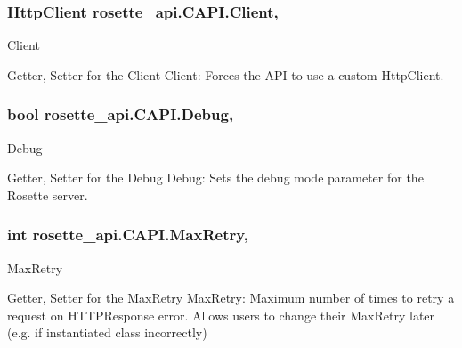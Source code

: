\subsubsection[{Client}]{\setlength{\rightskip}{0pt plus 5cm}Http\+Client rosette\+\_\+api.\+C\+A\+P\+I.\+Client\hspace{0.3cm}{\ttfamily [get]}, {\ttfamily [set]}}\label{classrosette__api_1_1_c_a_p_i_adb40d6828661d95567d124a2a57852d5}


Client 

Getter, Setter for the Client Client\+: Forces the A\+P\+I to use a custom Http\+Client. \hypertarget{classrosette__api_1_1_c_a_p_i_a16e8da8b7074a7d92505c623945f5b6e}{}
\subsubsection[{Debug}]{\setlength{\rightskip}{0pt plus 5cm}bool rosette\+\_\+api.\+C\+A\+P\+I.\+Debug\hspace{0.3cm}{\ttfamily [get]}, {\ttfamily [set]}}\label{classrosette__api_1_1_c_a_p_i_a16e8da8b7074a7d92505c623945f5b6e}


Debug 

Getter, Setter for the Debug Debug\+: Sets the debug mode parameter for the Rosette server. \hypertarget{classrosette__api_1_1_c_a_p_i_a62b4bd9343e43477f512ada376d4896d}{}
\subsubsection[{Max\+Retry}]{\setlength{\rightskip}{0pt plus 5cm}int rosette\+\_\+api.\+C\+A\+P\+I.\+Max\+Retry\hspace{0.3cm}{\ttfamily [get]}, {\ttfamily [set]}}\label{classrosette__api_1_1_c_a_p_i_a62b4bd9343e43477f512ada376d4896d}


Max\+Retry 

Getter, Setter for the Max\+Retry Max\+Retry\+: Maximum number of times to retry a request on H\+T\+T\+P\+Response error. Allows users to change their Max\+Retry later (e.\+g. if instantiated class incorrectly) \hypertarget{classrosette__api_1_1_c_a_p_i_a3e204eb9849f713e523e744e2ca5a1f1}{}
